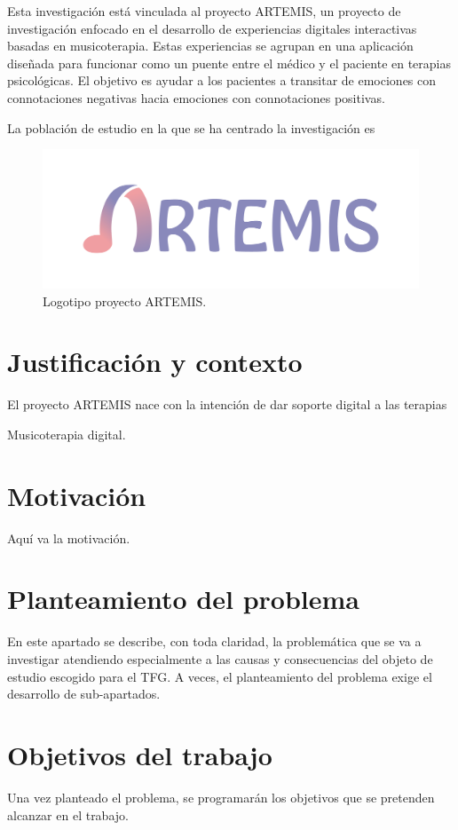 Esta investigación está vinculada al proyecto ARTEMIS, un proyecto de investigación enfocado en el desarrollo de experiencias digitales interactivas basadas en musicoterapia. Estas experiencias se agrupan en una aplicación diseñada para funcionar como un puente entre el médico y el paciente en terapias psicológicas. El objetivo es ayudar a los pacientes a transitar de emociones con connotaciones negativas hacia emociones con connotaciones positivas.

La población de estudio en la que se ha centrado la investigación es  

\begin{figure} [h!]
	\centering
	\includegraphics[width=0.7\linewidth]{Figuras/Introduccion/1_LogoArtemis}
	\caption{Logotipo proyecto ARTEMIS.}
	\label{fig:logoArtemis}
\end{figure}

\section{Justificación y contexto}

El proyecto ARTEMIS nace con la intención de dar soporte digital a las terapias

Musicoterapia digital.

\section{Motivación}

Aquí va la motivación.

\section{Planteamiento del problema}

En este apartado se describe, con toda claridad, la problemática que se va a investigar atendiendo especialmente a las causas y consecuencias del objeto de estudio escogido para el TFG. A veces, el planteamiento del problema exige el desarrollo de sub-apartados.

\section{Objetivos del trabajo}

Una vez planteado el problema, se programarán los objetivos que se pretenden alcanzar en el trabajo.